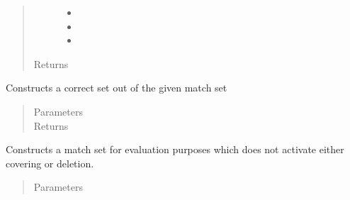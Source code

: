 \documentclass[letterpaper,10pt,english]{sphinxmanual}
\begin{document}
\begin{fulllineitems}
\begin{fulllineitems}
\begin{quote}
\begin{description}
\begin{itemize}
\item {} 
 \textendash{} 

\item {} 
 \textendash{} 

\item {} 
 \textendash{} 

\end{itemize}

\item[{Returns}] \leavevmode


\end{description}\end{quote}

\end{fulllineitems}


\begin{fulllineitems}
\label{\detokenize{eLCS:eLCS.ClassifierSet.ClassifierSet.makeCorrectSet}}
Constructs a correct set out of the given match set
\begin{quote}\begin{description}
\item[{Parameters}] \leavevmode
{} \textendash{} 

\item[{Returns}] \leavevmode


\end{description}\end{quote}

\end{fulllineitems}


\begin{fulllineitems}
\label{\detokenize{eLCS:eLCS.ClassifierSet.ClassifierSet.makeEvalMatchSet}}
Constructs a match set for evaluation purposes which does not activate either covering or deletion.
\begin{quote}\begin{description}
\item[{Parameters}] \leavevmode
{} \textendash{} 


\end{description}
\end{quote}
\end{fulllineitems}
\end{fulllineitems}
\end{document}

